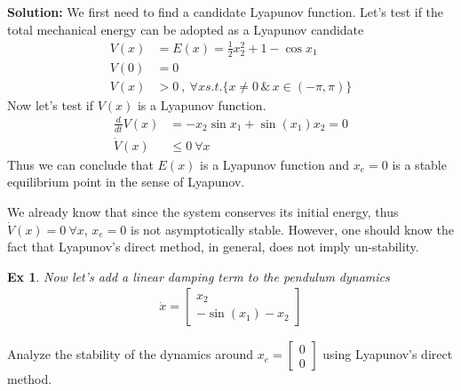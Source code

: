 \documentclass[twoside]{article}
\newtheorem{exmp}[theorem]{Ex}
\begin{document}
\textbf{Solution:} We first need to find a candidate Lyapunov function. Let's test if
the total mechanical energy can be adopted as a Lyapunov candidate
%
\begin{align*}
V(x) &= E(x) = \frac{1}{2} x_2^2 + 1 - \cos{x_1}  \\ 
V(0) &= 0 \\
V(x) &> 0 \ , \ \forall x s.t. \lbrace x \neq 0 \, \& \, x \in (-\pi , \pi)  \rbrace
\end{align*}
%
Now let's test if $V(x)$ is a Lyapunov function.
%
\begin{align*}
\frac{d}{dt} V(x) &= - x_2 \sin x_1 + \sin(x_1) x_2 = 0
\\
\dot{V}(x) &\leq 0 \ \forall x 
\end{align*}
%
Thus we can conclude that $E(x)$ is a Lyapunov function and $x_e = 0$
is a stable equilibrium point in the sense of Lyapunov. 

We already know that since the system conserves its initial energy, thus 
$\dot{V}(x) = 0 \ \forall x $, $x_e = 0$ is not  asymptotically stable. 
However, one should know the fact that Lyapunov's direct method, in general, does not imply 
un-stability.

\begin{exmp}
    Now let's add a linear damping term to the pendulum dynamics
    \begin{align*}
    \dot{x} = \begin{bmatrix} x_2 \\ -\sin(x_1) - x_2 \end{bmatrix}
\end{align*}
\end{exmp}
Analyze the stability of the dynamics around $x_e = \begin{bmatrix} 0 \\ 0 \end{bmatrix}$ using Lyapunov's direct method.
\end{document}

